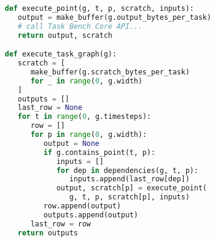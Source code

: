 \begin{lstlisting}[language=Python,caption={Excerpt from Task Bench implementation in Dask.\label{lst:code-sample}},float]
def execute_point(g, t, p, scratch, inputs):
   output = make_buffer(g.output_bytes_per_task)
   # call Task Bench Core API...
   return output, scratch

def execute_task_graph(g):
   scratch = [
      make_buffer(g.scratch_bytes_per_task)
      for _ in range(0, g.width)
   ]
   outputs = []
   last_row = None
   for t in range(0, g.timesteps):
      row = []
      for p in range(0, g.width):
         output = None
         if g.contains_point(t, p):
            inputs = []
            for dep in dependencies(g, t, p):
               inputs.append(last_row[dep])
            output, scratch[p] = execute_point(
               g, t, p, scratch[p], inputs)
         row.append(output)
         outputs.append(output)
      last_row = row
   return outputs
\end{lstlisting}
